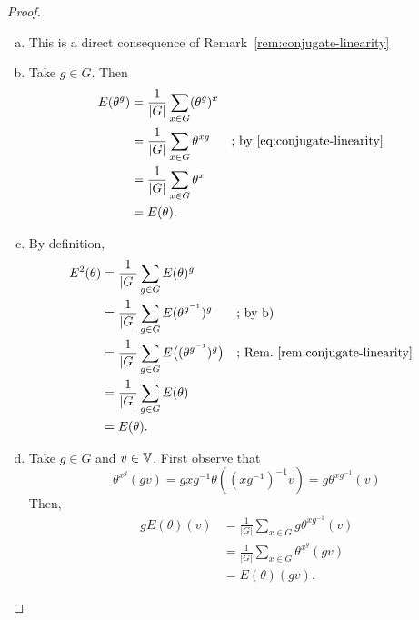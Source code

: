\begin{proof}${}$
    \begin{enumerate}[a)]
        \item This is a direct consequence of Remark~\ref{rem:conjugate-linearity}

        \item Take $g\in G$. Then
        \begin{align*}
            E(\theta^g) &= \frac1{|G|}\sum_{x\in G}
                    (\theta^g)^x\\
                &= \frac1{|G|}\sum_{x\in G}\theta^{xg}
                    &&\text{; by \eqref{eq:conjugate-linearity}}\\
                &= \frac1{|G|}\sum_{x\in G}\theta^x\\
                &= E(\theta).
        \end{align*}

        \item By definition,
        \begin{align*}
            E^2(\theta) &= \frac1{|G|}\sum_{g\in G}
                    E(\theta)^g\\
                &= \frac1{|G|}\sum_{g\in G}
                    E(\theta^{g^{-1}})^g
                        &&\text{; by b)}\\
                &= \frac1{|G|}\sum_{g\in G}
                    E\big((\theta^{g^{-1}})^g\big)
                        &&\text{; Rem.~\ref{rem:conjugate-linearity}}\\
                &= \frac1{|G|}\sum_{g\in G}E(\theta)\\
                &= E(\theta).
        \end{align*}

        \item Take $g\in G$ and $v\in\mathbb V$. First observe that
        $$
            \theta^{x^g}(gv) = gxg^{-1}\theta((xg^{-1})^{-1}v)
                = g\theta^{xg^{-1}}(v)
        $$
        Then,
        \begin{align*}
            gE(\theta)(v) &= \frac1{|G|}\sum_{x\in G}
                    g\theta^{xg^{-1}}(v)\\
                &= \frac1{|G|}\sum_{x\in G}
                    \theta^{x^g}(gv)\\
                &= E(\theta)(gv).
        \end{align*}
    \end{enumerate}
\end{proof}

